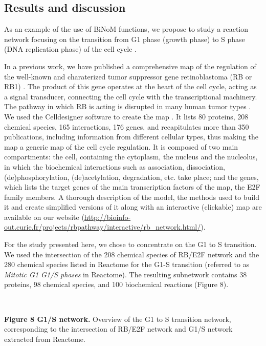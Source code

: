 \documentclass[11pt]{bmc_article_s50}
\newenvironment{bmcformat}{\begin{raggedright}\baselineskip20pt\sloppy\setboolean{publ}{false}}{\end{raggedright}\baselineskip20pt\sloppy}
\begin{document}
\begin{bmcformat}
\section*{Results and discussion}
As an example of the use of BiNoM functions, we propose to study a reaction network focusing on the transition from G1 phase
(growth phase) to S phase (DNA replication phase) of the cell cycle
\cite{calzone2008comprehensive}.

In a previous work, we have published a comprehensive map of the regulation of the well-known and charaterized tumor
suppressor gene retinoblastoma (RB or RB1) \cite{calzone2008comprehensive}. The product of this gene operates at
the heart of the cell cycle, acting as a signal transducer, connecting the
cell cycle with the transcriptional machinery. The pathway in which RB is
acting is disrupted in many human tumor types \cite{weinberg1995retinoblastoma}.
We used the Celldesigner software to create the map \cite{funahashi2003celldesigner}. It lists 80 proteins, 208 chemical species, 165
interactions, 176 genes, and recapitulates more than 350 publications, including
information from different cellular types, thus making the map a generic map of
the cell cycle regulation. It is composed of two main compartments: the cell,
containing the cytoplasm, the nucleus and the nucleolus, in which the
biochemical interactions such as association, dissociation, (de)phosphorylation,
(de)acetylation, degradation, etc. take place; and the genes, which lists the
target genes of the main transcription factors of the map, the E2F family
members.
A thorough description of the model, the methods used to build it and create
simplified versions of it along with an interactive (clickable) map are
available on our website
(\url{http://bioinfo-out.curie.fr/projects/rbpathway/interactive/rb_network.html/}).

For the study presented here, we chose to concentrate on the G1 to S transition. We
used the intersection of the 208 chemical species
of RB/E2F network and the 280 chemical species listed in Reactome \cite{joshi2005reactome} for the G1-S transition
(referred to as \emph{Mitotic G1 G1/S phases} in Reactome). The resulting
subnetwork contains 38 proteins, 98 chemical species, and 100 biochemical
reactions (Figure 8).

\hrulefill\

\vspace*{-15pt}
\textbf{Figure 8 G1/S network.}
Overview of the G1 to S transition network, corresponding to the intersection of
RB/E2F network and G1/S network extracted from Reactome.
\vspace*{-21pt}


\end{bmcformat}
\end{document}
